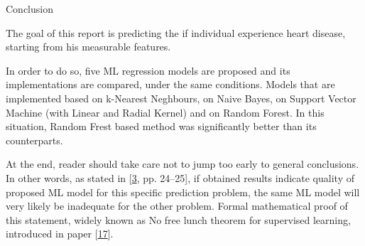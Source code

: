 \documentclass[
  ignorenonframetext,
]{beamer}
\begin{document}
\begin{frame}{Conclusion}
\protect\hypertarget{conclusion}{}

The goal of this report is predicting the if individual experience heart
disease, starting from his measurable features.

In order to do so, five ML regression models are proposed and its
implementations are compared, under the same conditions. Models that are
implemented based on k-Nearest Neghbours, on Naive Bayes, on Support
Vector Machine (with Linear and Radial Kernel) and on Random Forest. In
this situation, Random Frest based method was significantly better than
its counterparts.

At the end, reader should take care not to jump too early to general
conclusions. In other words, as stated in
{[}\protect\hyperlink{ref-murphy}{3}, pp. 24--25{]}, if obtained results
indicate quality of proposed ML model for this specific prediction
problem, the same ML model will very likely be inadequate for the other
problem. Formal mathematical proof of this statement, widely known as No
free lunch theorem for supervised learning, introduced in paper
{[}\protect\hyperlink{ref-walpert1996}{17}{]}.

\end{frame}
\end{document}
